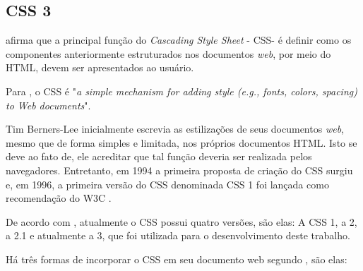 \subsection{CSS 3}

 afirma que a principal função do \textit{Cascading Style Sheet} - CSS\footnotemark[28] - é definir como os componentes anteriormente estruturados nos documentos \textit{web}, por meio do HTML, devem ser apresentados ao usuário.


Para , o CSS é "\textit{a simple mechanism for adding style (e.g., fonts, colors, spacing) to Web documents}\footnotemark[29]".


Tim Berners-Lee inicialmente escrevia as estilizações de seus documentos \textit{web}, mesmo que de forma simples e limitada, nos próprios documentos HTML. Isto se deve ao fato de, ele acreditar que tal função deveria ser realizada pelos navegadores. Entretanto, em 1994 a primeira proposta de criação do CSS surgiu e, em 1996, a primeira versão do CSS denominada CSS 1 foi lançada como recomendação do W3C \cite{silva_css_3}.

De acordo com , atualmente o CSS possui quatro versões, são elas: A CSS 1, a 2, a 2.1 e atualmente a 3, que foi utilizada para o desenvolvimento deste trabalho.

Há três formas de incorporar o CSS em seu documento web segundo \cite{silva_css_3}, são elas: 

